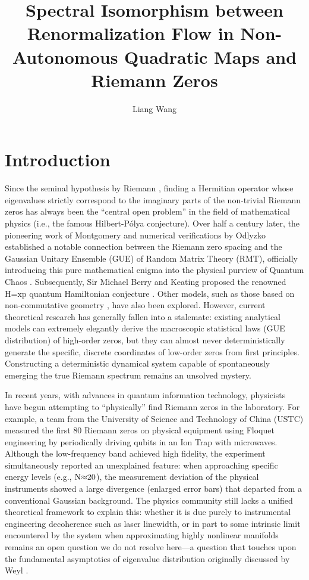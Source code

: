 \documentclass[fleqn,10pt]{wlscirep}
\title{Spectral Isomorphism between Renormalization Flow in Non-Autonomous Quadratic Maps and Riemann Zeros}
\author[1,*]{Liang Wang}
\affil[1]{School of Artificial Intelligence and Automation, Huazhong University of Science and Technology, Wuhan, 430070, P.R. China}
\affil[*]{wangliang.f@gmail.com}
\begin{document}
\flushbottom
\maketitle
\thispagestyle{empty}

\section*{Introduction}

Since the seminal hypothesis by Riemann \cite{riemann1859}, finding a Hermitian
operator whose eigenvalues strictly correspond to the imaginary parts of
the non-trivial Riemann zeros has always been the ``central open problem'' in the
field of mathematical physics (i.e., the famous Hilbert-P\'olya
conjecture). Over half a century later, the pioneering work of
Montgomery \cite{montgomery1973} and numerical verifications by Odlyzko \cite{odlyzko1987}
established a notable connection between the Riemann zero spacing and
the Gaussian Unitary Ensemble (GUE) of Random Matrix Theory (RMT),
officially introducing this pure mathematical enigma into the physical
purview of Quantum Chaos \cite{berry1986}. Subsequently, Sir Michael Berry and
Keating proposed the renowned \(\text{H}\text{=}\text{xp}\) quantum
Hamiltonian conjecture \cite{berry1999}. Other models, such as those based on
non-commutative geometry \cite{connes1999}, have also been explored. However,
current theoretical research has generally fallen into a stalemate:
existing analytical models can extremely elegantly derive the
macroscopic statistical laws (GUE distribution) of high-order zeros, but
they can almost never deterministically generate the specific, discrete
coordinates of low-order zeros from first principles. Constructing a
deterministic dynamical system capable of spontaneously emerging the
true Riemann spectrum remains an unsolved mystery.

In recent years, with advances in quantum information technology,
physicists have begun attempting to ``physically'' find Riemann zeros in
the laboratory. For example, a team from the University of Science and
Technology of China (USTC) measured the first 80 Riemann
zeros on physical equipment using Floquet engineering by periodically
driving qubits in an Ion Trap with microwaves. Although the
low-frequency band achieved high fidelity, the experiment
simultaneously reported an unexplained feature: when approaching
specific energy levels (e.g., \(\text{N}\text{\ensuremath{\approx}20}\)), the measurement
deviation of the physical instruments showed a large divergence
(enlarged error bars) that departed from a conventional Gaussian background.
The physics community still lacks a unified theoretical framework to
explain this: whether it is due purely to instrumental engineering
decoherence such as laser linewidth, or in part to some intrinsic limit
encountered by the system when approximating highly nonlinear
manifolds remains an open question we do not resolve here---a question
that touches upon the fundamental asymptotics of
eigenvalue distribution originally discussed by Weyl \cite{weyl1912}.
\end{document}
